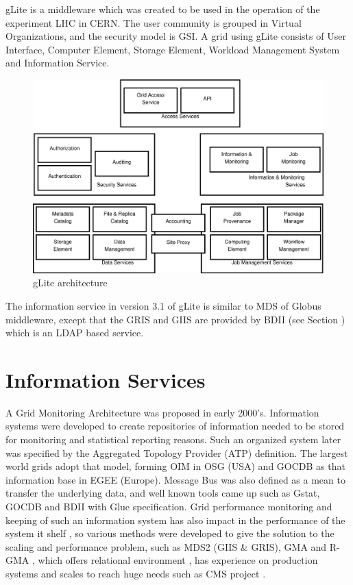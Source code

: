 gLite is a middleware which was created to be used in the operation of the experiment LHC in CERN. The user community is grouped in Virtual Organizations, and the security model is GSI. A grid using gLite consists of User Interface, Computer Element, Storage Element, Workload Management System and Information Service.

\begin{figure}[htb]
\centering
 \includegraphics[width=6in]{images/glite.eps}
\caption{gLite architecture}
\label{figure:glite}
\end{figure}

The information service in version 3.1 of gLite is similar to MDS of Globus middleware, except that the GRIS and GIIS are provided by BDII (see Section ) which is an LDAP based service.


\section{Information Services}
A Grid Monitoring Architecture \cite{tierney2002grid} was proposed in early 2000's. Information systems were developed to create repositories of information needed to be stored for monitoring and statistical reporting reasons. Such an organized system later was specified by the Aggregated Topology Provider (ATP) definition. The largest world grids adopt that model, forming OIM in OSG (USA) and GOCDB as that information base in EGEE (Europe). Message Bus was also defined as a mean to transfer the underlying data, and well known tools came up such as Gstat, GOCDB and BDII with Glue specification. Grid performance monitoring and keeping of such an information system has also impact in the performance of the system it shelf \cite{zhang2003performance}, so various methods were developed to give the solution to the scaling and performance problem, such as MDS2 (GIIS \& GRIS), GMA and R-GMA \cite{wilson2004information}, which offers relational environment \cite{fisher2001relational}, has experience on production systems \cite{byrom-production} and scales to reach huge needs such as CMS project \cite{Bonacorsi2004,Byrom}.

